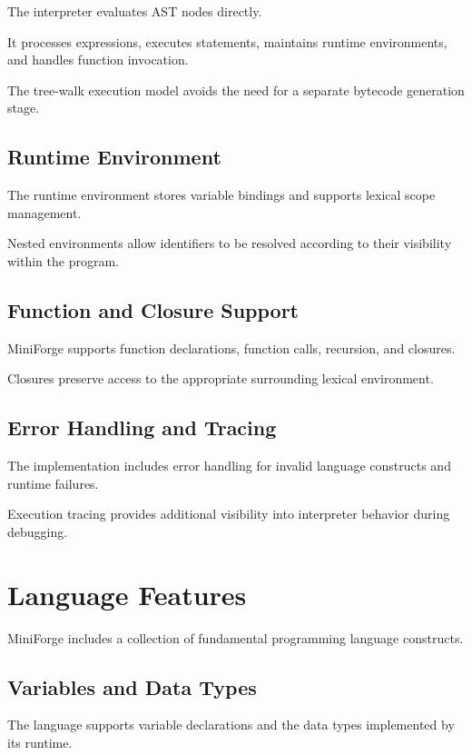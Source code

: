 \documentclass[conference]{IEEEtran}
\begin{document}
The interpreter evaluates AST nodes directly.

It processes expressions, executes statements,
maintains runtime environments, and handles
function invocation.

The tree-walk execution model avoids the need
for a separate bytecode generation stage.

\subsection{Runtime Environment}

The runtime environment stores variable bindings
and supports lexical scope management.

Nested environments allow identifiers to be
resolved according to their visibility within
the program.

\subsection{Function and Closure Support}

MiniForge supports function declarations, function
calls, recursion, and closures.

Closures preserve access to the appropriate
surrounding lexical environment.

\subsection{Error Handling and Tracing}

The implementation includes error handling for
invalid language constructs and runtime failures.

Execution tracing provides additional visibility
into interpreter behavior during debugging.

\section{Language Features}

MiniForge includes a collection of fundamental
programming language constructs.

\subsection{Variables and Data Types}

The language supports variable declarations and
the data types implemented by its runtime.
\end{document}
